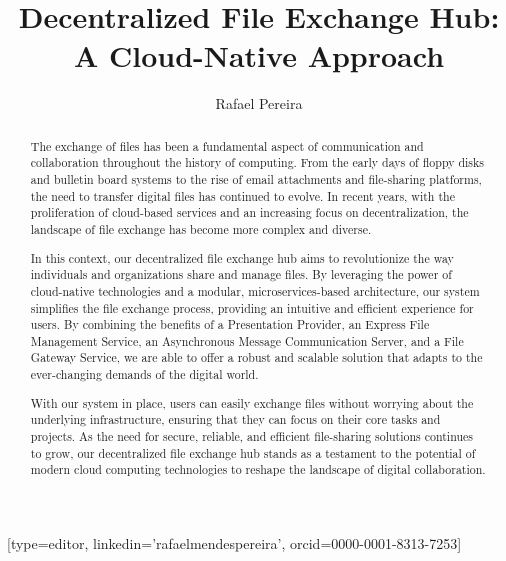 \documentclass[a4paper,fleqn]{cas-dc}
\begin{document}
\let\WriteBookmarks\relax
\def\floatpagepagefraction{1}
\def\textpagefraction{.001}


\title [mode = title]{Decentralized File Exchange Hub: A Cloud-Native Approach}                     


\author[1]{Rafael Pereira}[type=editor,
                        linkedin='rafaelmendespereira',
                        orcid=0000-0001-8313-7253]
   
\address[1]{Computer Science and Communications Research Centre, School of Technology and Management, Polytechnic of Leiria, 2411-901 Leiria, Portugal}

\begin{abstract}

The exchange of files has been a fundamental aspect of communication and collaboration throughout the history of computing. From the early days of floppy disks and bulletin board systems to the rise of email attachments and file-sharing platforms, the need to transfer digital files has continued to evolve. In recent years, with the proliferation of cloud-based services and an increasing focus on decentralization, the landscape of file exchange has become more complex and diverse.

In this context, our decentralized file exchange hub aims to revolutionize the way individuals and organizations share and manage files. By leveraging the power of cloud-native technologies and a modular, microservices-based architecture, our system simplifies the file exchange process, providing an intuitive and efficient experience for users. By combining the benefits of a Presentation Provider, an Express File Management Service, an Asynchronous Message Communication Server, and a File Gateway Service, we are able to offer a robust and scalable solution that adapts to the ever-changing demands of the digital world.

With our system in place, users can easily exchange files without worrying about the underlying infrastructure, ensuring that they can focus on their core tasks and projects. As the need for secure, reliable, and efficient file-sharing solutions continues to grow, our decentralized file exchange hub stands as a testament to the potential of modern cloud computing technologies to reshape the landscape of digital collaboration.

\end{abstract}
\end{document}
